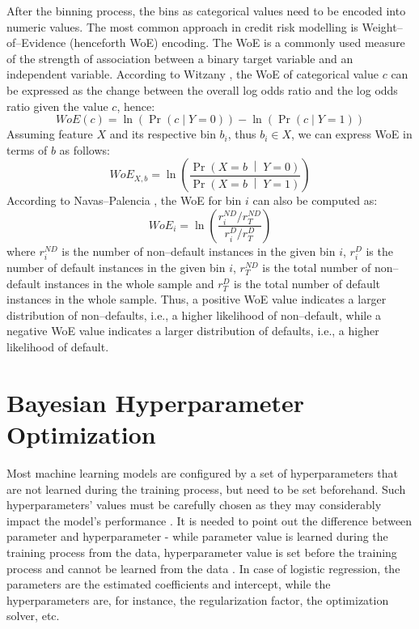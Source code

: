 After the binning process, the bins as categorical values need to be encoded into numeric values. The most common approach in credit risk modelling is Weight--of--Evidence (henceforth WoE) encoding. The WoE is a commonly used measure of the strength of association between a binary target variable and an independent variable.
According to Witzany \citep{witzany2017credit}, the WoE of categorical value $c$ can be expressed as the change between the overall log odds ratio and the log odds ratio given the value $c$, hence:
\begin{equation}\label{eq}
     WoE\left(c\right) = \ln\left(\operatorname{Pr}\left(c \mid Y = 0 \right) \right) - \ln\left(\operatorname{Pr}\left(c \mid Y = 1 \right) \right)
\end{equation}
Assuming feature $X$ and its respective bin $b_i$, thus $b_i \in X$, we can express WoE in terms of $b$ as follows:
\begin{equation}\label{eq}
    WoE_{X, b}= \ln \left(\frac{\Pr{\left(X = b\;\middle|\;Y = 0\right)}}{\Pr{\left(X = b\;\middle|\;Y = 1\right)}}\right)
\end{equation}
According to Navas--Palencia \citep{navas2020optimal}, the WoE for bin $i$ can also be computed as:
\begin{equation}\label{eq}
    WoE_{i} = \ln \left( \frac{r^{ND}_i / r^{ND}_T} {r^{D}_i / r^{D}_T} \right)
\end{equation}
where $r^{ND}_i$ is the number of non--default instances in the given bin $i$, $r^{D}_i$ is the number of default instances in the given bin $i$, $r^{ND}_T$ is the total number of non--default instances in the whole sample and $r^{D}_T$ is the total number of default instances in the whole sample.
Thus, a positive WoE value indicates a larger distribution of non--defaults, i.e., a higher likelihood of non--default, while a negative WoE value indicates a larger distribution of defaults, i.e., a higher likelihood of default.

\newpage
\section{Bayesian Hyperparameter Optimization}
\label{sec:bayesoptheory}
Most machine learning models are configured by a set of hyperparameters that are not learned during the training process, but need to be set beforehand. Such hyperparameters' values must be carefully chosen as they may considerably impact the model's performance \citep{bischl2023hyperparameter}.
It is needed to point out the difference between parameter and hyperparameter - while parameter value is learned during the training process from the data, hyperparameter value is set before the training process and cannot be learned from the data \citep{owen2022hyperparameter}. In case of logistic regression, the parameters are the estimated coefficients and intercept, while the hyperparameters are, for instance, the regularization factor, the optimization solver, etc.


